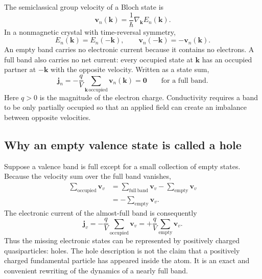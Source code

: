 The semiclassical group velocity of a Bloch state is
\begin{equation}
  \bm v_n(\bm k)
  =\frac{1}{\hbar}\nabla_{\bm k}E_n(\bm k).
  \label{eq:bloch-group-velocity}
\end{equation}
In a nonmagnetic crystal with time-reversal symmetry,
\begin{equation}
  E_n(\bm k)=E_n(-\bm k),
  \qquad
  \bm v_n(-\bm k)=-\bm v_n(\bm k).
  \label{eq:time-reversal-band-velocity}
\end{equation}
An empty band carries no electronic current because it contains no electrons.
A full band also carries no net current: every occupied state at $\bm k$ has an
occupied partner at $-\bm k$ with the opposite velocity.  Written as a state
sum,
\begin{equation}
  \bm j_n
  =-\frac{q}{V}\sum_{\bm k\,\text{occupied}}\bm v_n(\bm k)
  =\bm 0
  \qquad\text{for a full band}.
  \label{eq:full-band-zero-current}
\end{equation}
Here $q>0$ is the magnitude of the electron charge.  Conductivity requires a
band to be only partially occupied so that an applied field can create an
imbalance between opposite velocities.

\subsection{Why an empty valence state is called a hole}

Suppose a valence band is full except for a small collection of empty states.
Because the velocity sum over the full band vanishes,
\begin{equation}
\begin{aligned}
  \sum_{\mathrm{occupied}}\bm v_v
  &=\sum_{\mathrm{full\ band}}\bm v_v
    -\sum_{\mathrm{empty}}\bm v_v\\
  &=-\sum_{\mathrm{empty}}\bm v_v.
\end{aligned}
  \label{eq:occupied-empty-velocity-sum}
\end{equation}
The electronic current of the almost-full band is consequently
\begin{equation}
  \bm j_v
  =-\frac{q}{V}\sum_{\mathrm{occupied}}\bm v_v
  =+\frac{q}{V}\sum_{\mathrm{empty}}\bm v_v.
  \label{eq:hole-current-equivalence}
\end{equation}
Thus the missing electronic states can be represented by positively charged
quasiparticles: holes.  The hole description is not the claim that a positively
charged fundamental particle has appeared inside the atom.  It is an exact and
convenient rewriting of the dynamics of a nearly full band.

